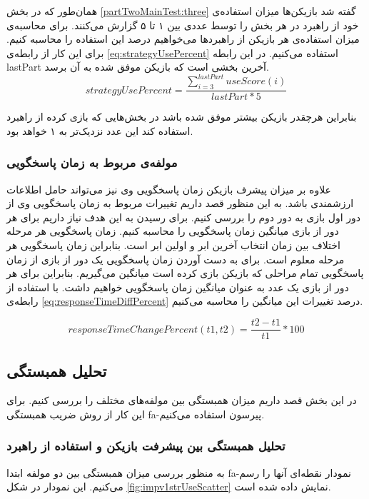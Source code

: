 \documentclass[twoside, a4paper,11pt]{book}
\numberwithin{equation}{chapter}
\numberwithin{table}{chapter}
\numberwithin{figure}{chapter}
\numberwithin{equation}{chapter}
\newcommand{\mls}[1]{\gls{fa-#1}\glsuseri{la-#1}}
\begin{document}
همان‌طور که در بخش \ref{partTwoMainTest:three} گفته شد بازیکن‌ها میزان استفاده‌ی خود از راهبرد در هر بخش را توسط عددی بین ۱ تا ۵ گزارش می‌کنند. برای محاسبه‌ی میزان استفاده‌ی هر بازیکن از راهبردها می‌خواهیم درصد این استفاده را محاسبه کنیم. برای این کار از رابطه‌ی \ref{eq:strategyUsePercent} استفاده می‌کنیم. در این رابطه lastPart آخرین بخشی است که بازیکن موفق شده به آن برسد.
\begin{equation}
\label{eq:strategyUsePercent}
strategyUsePercent = \frac{\sum_{i=3}^{lastPart} useScore(i)}{lastPart*5}
\end{equation}

بنابراین هرچقدر بازیکن بیشتر موفق شده باشد در بخش‌هایی که بازی کرده از راهبرد استفاده کند این عدد نزدیک‌تر به ۱ خواهد بود.

\subsubsection{مولفه‌ی مربوط به زمان پاسخگویی}
علاوه بر میزان پیشرف بازیکن زمان پاسخگویی وی نیز می‌تواند حامل اطلاعات ارزشمندی باشد. به این منظور قصد داریم تغییرات مربوط به زمان پاسخگویی وی از دور اول بازی به دور دوم را بررسی کنیم. برای رسیدن به این هدف نیاز داریم برای هر دور از بازی میانگین زمان پاسخگویی را محاسبه کنیم. زمان پاسخگویی هر مرحله اختلاف بین زمان انتخاب آخرین ابر و اولین ابر است. بنابراین زمان پاسخگویی هر مرحله معلوم است. برای به دست آوردن زمان پاسخگویی یک دور از بازی از زمان پاسخگویی تمام مراحلی که بازیکن بازی کرده است میانگین می‌گیریم. بنابراین برای هر دور از بازی یک عدد به عنوان میانگین زمان پاسخگویی خواهیم داشت. با استفاده از رابطه‌ی \ref{eq:responseTimeDiffPercent} درصد تغییرات این میانگین را محاسبه می‌کنیم.

\begin{equation}
\label{eq:responseTimeDiffPercent}
	responseTimeChangePercent(t1, t2) = \frac{t2 - t1}{t1}*100
\end{equation}

\subsection{تحلیل همبستگی}
در این بخش قصد داریم میزان همبستگی بین مولفه‌های مختلف را بررسی کنیم. برای این کار از روش ضریب همبستگی  \mls{پیرسون} استفاده می‌کنیم.
\subsubsection{تحلیل همبستگی بین پیشرفت بازیکن و استفاده از راهبرد}

به منظور بررسی میزان همبستگی بین دو مولفه ابتدا \mls{نمودار نقطه‌ای} آنها را رسم می‌کنیم. این نمودار در شکل \ref{fig:impv1strUseScatter} نمایش داده شده است.
\end{document}
